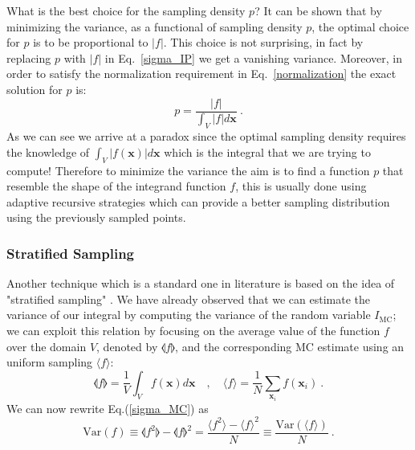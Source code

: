 \documentclass[../main/main.tex]{subfiles}
\begin{document}
What is the best choice for the sampling density $p$?
It can be shown that by minimizing the variance, as a functional of sampling density $p$, the optimal choice for $p$ is to be proportional 
to $|f|$. This choice is not surprising, in fact by replacing $p$ with $|f|$ in Eq.~\ref{sigma_IP} we get a vanishing variance.
Moreover, in order to satisfy the normalization requirement in Eq.~\ref{normalization} the exact solution for $p$ is:
\begin{equation}
	p = \frac{|f|}{\int_V |f| d\textbf{x}} \ .
\end{equation}
\newline
As we can see we arrive at a paradox since the optimal sampling density requires the knowledge of $\int_V |f(\textbf{x})| d\textbf{x}$ which is the integral that we are trying to compute!
\newline
Therefore to minimize the variance the aim is to find a function $p$ that resemble the shape of the integrand function $f$, this is usually done 
using adaptive recursive strategies which can provide a better sampling distribution using the previously sampled points.
\subsubsection{Stratified Sampling}
Another technique which is a standard one in literature is based on the idea of  "stratified sampling" \cite{Press:1989vk, Press:1992zz}.
We have already observed that we can estimate the variance of our integral by computing the variance of the random variable $I_{\text{MC}}$; we can exploit this relation by focusing on the average value of the function $f$ over the domain $V$, denoted by $\llangle  f \rrangle $, and the corresponding MC estimate using an uniform sampling $ \langle f \rangle$:
\begin{equation}
	\llangle  f \rrangle = \frac{1}{V} \int_V f(\textbf{x}) d\textbf{x} \quad ,  \quad 
	\langle f \rangle = \frac{1}{N} \sum_{\textbf{x}_i} f(\textbf{x}_i) \ .
\end{equation}
We can now rewrite Eq.(\ref{sigma_MC}) as  
\begin{equation}
	\text{Var}( f ) \equiv \llangle f^2 \rrangle - \llangle f \rrangle ^2 = \frac{\langle f^2 \rangle - \langle f \rangle^2}{N} \equiv \frac{\text{Var}(\langle f \rangle )}{N} \ .
\end{equation}
\end{document}
